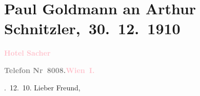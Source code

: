 

\renewcommand{\erwaehntePersonen}{Personen: Eva Marie Goldmann, Olga Schnitzler}
\renewcommand{\erwaehnteOrte}{Orte: Berlin, Hotel Sacher, Wien}
\renewcommand{\erwaehnteWerke}{}
\section[ Paul Goldmann an Arthur Schnitzler, 30. 12. 1910]{Paul Goldmann an Arthur Schnitzler, 30. 12. 1910}
\nopagebreak{}
\rehead{ }\normalsize\beginnumbering{}
\toendnotes[C]{\smallbreak\pagebreak[2]}
\toendnotes[C]{\smallbreak}
\pstart
           \noindent{}\centering{}{\pb}\textcolor{gray}{\textbf{\textcolor{pink}{Hotel Sacher}{}\ledrightnote{\textcolor{pink}{Hotel Sacher}}}}\pend
           
\pstart
           \noindent{}\textcolor{gray}{\textbf{Telefon Nr 8008.}}\hfill \textcolor{gray}{\textbf{\textcolor{pink}{Wien I.}{}\ledrightnote{\textcolor{pink}{Wien}}}}\pend
           
. 12. 10. \hfill Lieber Freund,\pend
           
